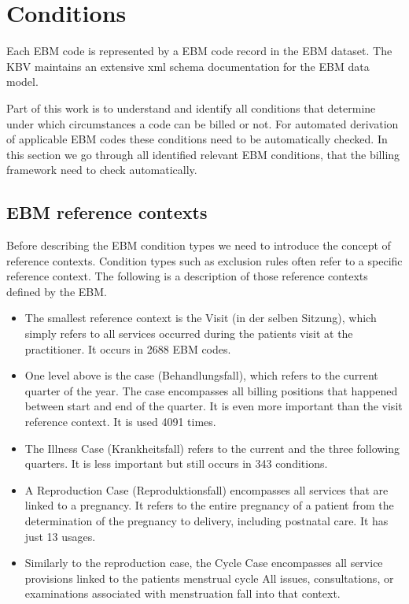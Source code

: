 \section{Conditions}\label{sec:conditions}


Each EBM code is represented by a EBM code record in the EBM dataset.
The KBV maintains an extensive xml schema documentation for the EBM data model.


Part of this work is to understand and identify all conditions that determine under which circumstances a code can be billed or not.
For automated derivation of applicable EBM codes these conditions need to be automatically checked.
In this section we go through all identified relevant EBM conditions, that the billing framework need to check automatically.


\subsection{EBM reference contexts}
Before describing the EBM condition types we need to introduce the concept of reference contexts.
Condition types such as exclusion rules often refer to a specific reference context.
The following is a description of those reference contexts defined by the EBM.
\begin{itemize}
    \item The smallest reference context is the Visit (in der selben Sitzung), which simply refers to all services occurred during the patients visit at the practitioner.
    It occurs in 2688 EBM codes.
    \item One level above is the case (Behandlungsfall), which refers to the current quarter of the year.
     The case encompasses all billing positions that happened between start and end of the quarter.
    It is even more important than the visit reference context.
    It is used 4091 times.
    \item The Illness Case (Krankheitsfall) refers to the current and the three following quarters.
    It is less important but still occurs in 343 conditions.
    \item A Reproduction Case (Reproduktionsfall) encompasses all services that are linked to a pregnancy.
    It refers to the entire pregnancy of a patient from the determination of the pregnancy to delivery, including postnatal care.
    It has just 13 usages.
    \item Similarly to the reproduction case, the Cycle Case encompasses all service provisions linked to the patients menstrual cycle
    All issues, consultations, or examinations associated with menstruation fall into that context.
\end{itemize}
